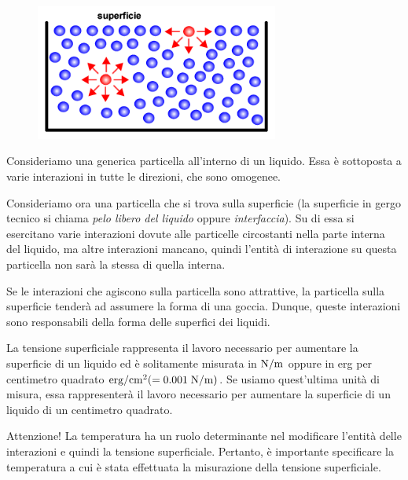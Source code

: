 \begin{figure}[htp]
   \centering
   \includegraphics[width=8cm]{immagini/tensione_superficiale.png}
\end{figure}

Consideriamo una generica particella all'interno di un liquido. Essa è sottoposta a varie interazioni in tutte le direzioni, che sono omogenee. 
   
Consideriamo ora una particella che si trova sulla superficie (la superficie in gergo tecnico si chiama \textit{pelo libero del liquido} oppure \textit{interfaccia}). Su di essa si esercitano varie interazioni dovute alle particelle circostanti nella parte interna del liquido, ma altre interazioni mancano, quindi l'entità di interazione su questa particella non sarà la stessa di quella interna.

Se le interazioni che agiscono sulla particella sono attrattive, la particella sulla superficie tenderà ad assumere la forma di una goccia. Dunque, queste interazioni sono responsabili della forma delle superfici dei liquidi.

La tensione superficiale rappresenta il lavoro necessario per aumentare la superficie di un liquido ed è solitamente misurata in $\rm N/m$ oppure in erg per centimetro quadrato $\rm erg/cm^2(=0.001 \; N/m)$. Se usiamo quest'ultima unità di misura, essa rappresenterà il lavoro necessario per aumentare la superficie di un liquido di un centimetro quadrato.

Attenzione! La temperatura ha un ruolo determinante nel modificare l'entità delle interazioni e quindi la tensione superficiale. Pertanto, è importante specificare la temperatura a cui è stata effettuata la misurazione della tensione superficiale.

